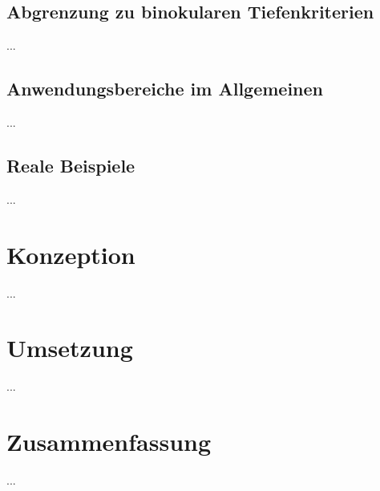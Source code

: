 \subsection{Abgrenzung zu binokularen Tiefenkriterien}
...

\subsection{Anwendungsbereiche im Allgemeinen}
...

\subsection{Reale Beispiele}
...

\section{Konzeption}
...

\section{Umsetzung}
...

\section{Zusammenfassung}
...